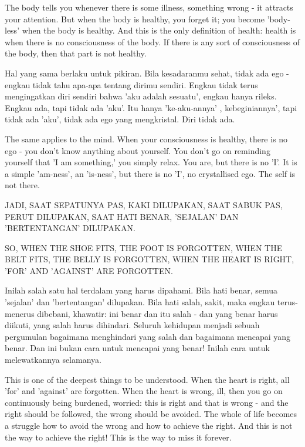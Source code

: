 \english
The body tells you whenever there is some illness, something wrong - it attracts your attention. But when the body is healthy, you forget it; you become 'body-less' when the body is healthy. And this is the only definition of health: health is when there is no consciousness of the body. If there is any sort of consciousness of the body, then that part is not healthy.

\bahasa
Hal yang sama berlaku untuk pikiran. Bila kesadaranmu sehat, tidak ada ego - engkau tidak tahu apa-apa tentang dirimu sendiri. Engkau tidak terus mengingatkan diri sendiri bahwa 'aku adalah sesuatu', engkau hanya rileks. Engkau ada, tapi tidak ada 'aku'. Itu hanya 'ke-aku-annya' , kebeginiannya', tapi tidak ada 'aku', tidak ada ego yang mengkristal. Diri tidak ada.

\english
The same applies to the mind. When your consciousness is healthy, there is no ego - you don't know anything about yourself. You don't go on reminding yourself that 'I am something,' you simply relax. You are, but there is no 'I'. It is a simple 'am-ness', an 'is-ness', but there is no 'I', no crystallised ego. The self is not there.

\bahasa
JADI, SAAT SEPATUNYA PAS, KAKI DILUPAKAN, SAAT SABUK PAS, PERUT DILUPAKAN, SAAT HATI BENAR, 'SEJALAN' DAN 'BERTENTANGAN' DILUPAKAN.

\english
SO, WHEN THE SHOE FITS, THE FOOT IS FORGOTTEN, WHEN THE BELT FITS, THE BELLY IS FORGOTTEN, WHEN THE HEART IS RIGHT, 'FOR' AND 'AGAINST' ARE FORGOTTEN.

\bahasa
Inilah salah satu hal terdalam yang harus dipahami. Bila hati benar, semua 'sejalan' dan 'bertentangan' dilupakan. Bila hati salah, sakit, maka engkau terus-menerus dibebani, khawatir: ini benar dan itu salah - dan yang benar harus diikuti, yang salah harus dihindari. Seluruh kehidupan menjadi sebuah pergumulan bagaimana menghindari yang salah dan bagaimana mencapai yang benar. Dan ini bukan cara untuk mencapai yang benar! Inilah cara untuk melewatkannya selamanya.

\english
This is one of the deepest things to be understood. When the heart is right, all 'for' and 'against' are forgotten. When the heart is wrong, ill, then you go on continuously being burdened, worried: this is right and that is wrong - and the right should be followed, the wrong should be avoided. The whole of life becomes a struggle how to avoid the wrong and how to achieve the right. And this is not the way to achieve the right! This is the way to miss it forever.

